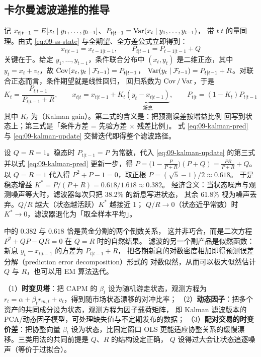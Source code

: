 \subsection{卡尔曼滤波递推的推导}

记 $x_{t|t-1}=E[x_t\mid y_1,\dots,y_{t-1}]$、$P_{t|t-1}=\operatorname{Var}(x_t\mid y_1,\dots,y_{t-1})$，
带 $t|t$ 的量同理。由式 \eqref{eq:09-ss-state} 与全期望、全方差公式立即得到：
\begin{equation}\label{eq:09-kalman-pred}
  x_{t|t-1}=x_{t-1|t-1},\qquad P_{t|t-1}=P_{t-1|t-1}+Q
\end{equation}
关键在于。给定 $y_1,\dots,y_{t-1}$，条件联合分布中
$(x_t,y_t)$ 是二维正态，其中 $y_t=x_t+v_t$，故 $\operatorname{Cov}(x_t,y_t\mid \mathcal{F}_{t-1})=P_{t|t-1}$，
$\operatorname{Var}(y_t\mid\mathcal{F}_{t-1})=P_{t|t-1}+R$。对联合正态而言，条件期望就是线性回归，
回归系数为 $\operatorname{Cov}/\operatorname{Var}$，于是
\begin{equation}\label{eq:09-kalman-update}
  K_t=\frac{P_{t|t-1}}{P_{t|t-1}+R},\qquad
  x_{t|t}=x_{t|t-1}+K_t\underbrace{(y_t-x_{t|t-1})}_{\text{新息}},\qquad
  P_{t|t}=(1-K_t)P_{t|t-1}
\end{equation}
其中 $K_t$ 为（Kalman gain）。第二式的含义是：把预测误差按增益比例
回写到状态上；第三式是「条件方差 = 先验方差 $\times$ 残差比例」。
式 \eqref{eq:09-kalman-pred} 与 \eqref{eq:09-kalman-update} 交替迭代即得整个滤波路径。

\begin{example}[卡尔曼增益的稳态解]\label{ex:09-kalman}
设 $Q=R=1$。稳态时 $P_{t|t-1}=P$ 为常数，代入 \cref{eq:09-kalman-update}
的第三式并以式 \eqref{eq:09-kalman-pred} 更新一步，得
$P=\bigl(1-\frac{P}{P+R}\bigr)(P+Q)=\frac{PR}{P+R}+Q$。
以 $Q=R=1$ 代入得 $P^2+P-1=0$，取正根 $P=(\sqrt{5}-1)/2\approx 0.618$。
于是稳态增益 $K^\ast=P/(P+R)=0.618/1.618\approx 0.382$。
经济含义：当状态噪声与观测噪声等大时，滤波器每次只把 38.2\% 的新息写进状态，
其余 61.8\% 视为噪声丢弃。$Q/R$ 越大（状态越活跃）$K^\ast$ 越接近 1；
$Q/R\to 0$（状态近乎常数）时 $K^\ast\to 0$，滤波器退化为「取全样本平均」。
\end{example}

 中的 $0.382$ 与 $0.618$ 恰是黄金分割的两个倒数关系，
这并非巧合，而是二次方程 $P^2+QP-QR=0$ 在 $Q=R$ 时的自然结果。
滤波的另一个副产品是似然函数：新息 $y_t-x_{t|t-1}$ 的方差为 $P_{t|t-1}+R$，
把各期新息的对数密度相加即得预测误差分解（prediction error decomposition）形式的
对数似然，从而可以极大似然估计 $Q$ 与 $R$，也可以用 EM 算法迭代。

\begin{appbox}[状态空间模型在量化中的三类用法]
（1）\textbf{时变贝塔}：把 CAPM 的 $\beta_t$ 设为随机游走状态，观测方程为
$r_t=\alpha+\beta_t r_{m,t}+v_t$，得到随市场状态漂移的对冲比率；
（2）\textbf{动态因子}：把多个资产的共同成分设为状态，观测方程为因子载荷矩阵，
即 Kalman 滤波版本的 PCA/动态因子模型，可处理缺失值与不定期发布的数据；
（3）\textbf{配对交易的时变价差}：把协整向量 $\beta_t$ 设为状态，比固定窗口 OLS
更能适应协整关系的缓慢漂移。三类用法的共同前提是 $Q$、$R$ 的结构设定正确，
$Q$ 设得过大会让状态追逐噪声（等价于过拟合）。
\end{appbox}

